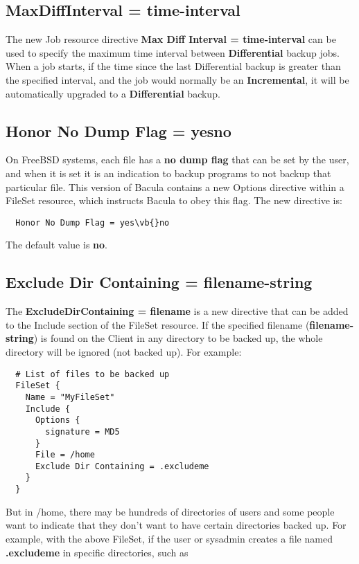 \subsection{MaxDiffInterval = \lt{}time-interval\gt{}}
The new Job resource directive {\bf Max Diff Interval = \lt{}time-interval\gt{}}
can be used to specify the maximum time interval between {\bf Differential} backup
jobs. When a job starts, if the time since the last Differential backup is
greater than the specified interval, and the job would normally be an
{\bf Incremental}, it will be automatically
upgraded to a {\bf Differential} backup.

\subsection{Honor No Dump Flag = \lt{}yes\vb{}no\gt{}}
On FreeBSD systems, each file has a {\bf no dump flag} that can be set
by the user, and when it is set it is an indication to backup programs
to not backup that particular file.  This version of Bacula contains a
new Options directive within a FileSet resource, which instructs Bacula to
obey this flag.  The new directive is:

\begin{verbatim}
  Honor No Dump Flag = yes\vb{}no
\end{verbatim}

The default value is {\bf no}.


\subsection{Exclude Dir Containing = \lt{}filename-string\gt{}}
The {\bf ExcludeDirContaining = \lt{}filename\gt{}} is a new directive that
can be added to the Include section of the FileSet resource.  If the specified
filename ({\bf filename-string}) is found on the Client in any directory to be
backed up, the whole directory will be ignored (not backed up).  For example:

\begin{verbatim}
  # List of files to be backed up
  FileSet {
    Name = "MyFileSet"
    Include {
      Options {
        signature = MD5
      }
      File = /home
      Exclude Dir Containing = .excludeme
    }
  }
\end{verbatim}

But in /home, there may be hundreds of directories of users and some
people want to indicate that they don't want to have certain
directories backed up. For example, with the above FileSet, if
the user or sysadmin creates a file named {\bf .excludeme} in 
specific directories, such as

